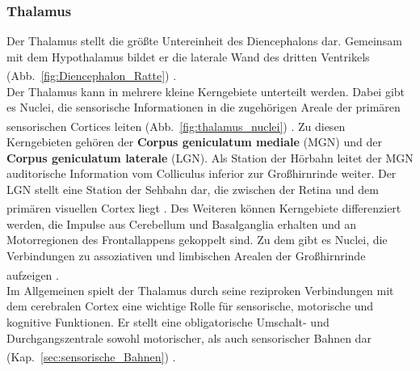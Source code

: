 \subsubsection{Thalamus}
\label{subsubsec:Thalamus} 

Der Thalamus stellt die größte Untereinheit des Diencephalons dar. Gemeinsam mit dem Hypothalamus bildet er die laterale Wand des dritten Ventrikels (Abb.~\ref{fig:Diencephalon_Ratte})  \textsuperscript{\cite[Kap.~12]{crossman2014neuroanatomy}}. \\

\noindent Der Thalamus kann in mehrere kleine Kerngebiete unterteilt werden. Dabei gibt es Nuclei, die sensorische Informationen in die zugehörigen Areale der primären sensorischen Cortices leiten (Abb.~\ref{fig:thalamus_nuclei}) \textsuperscript{\cite[Kap.~12]{crossman2014neuroanatomy}}. Zu diesen Kerngebieten gehören der \textbf{Corpus geniculatum mediale} (MGN) und der \textbf{Corpus geniculatum laterale} (LGN). Als Station der Hörbahn leitet der MGN auditorische Information vom Colliculus inferior zur Großhirnrinde weiter. Der LGN stellt eine Station der Sehbahn dar, die zwischen der Retina und dem primären visuellen Cortex liegt \textsuperscript{\cite[Kap.~14]{penzlin2005tierphys}}. Des Weiteren können Kerngebiete differenziert werden, die Impulse aus Cerebellum und Basalganglia erhalten und an Motorregionen des Frontallappens gekoppelt sind. Zu dem gibt es Nuclei, die Verbindungen zu assoziativen und limbischen Arealen der Großhirnrinde aufzeigen \textsuperscript{\cite[Kap.~12]{crossman2014neuroanatomy}}.\\
\noindent Im Allgemeinen spielt der Thalamus durch seine reziproken Verbindungen mit dem cerebralen Cortex eine wichtige Rolle für sensorische, motorische und kognitive Funktionen. Er stellt eine obligatorische Umschalt- und Durchgangszentrale sowohl motorischer, als auch sensorischer Bahnen dar (Kap.~\ref{sec:sensorische_Bahnen}) \textsuperscript{\cite[Kap.~6]{storch2012lehrbuchzoo}}.

